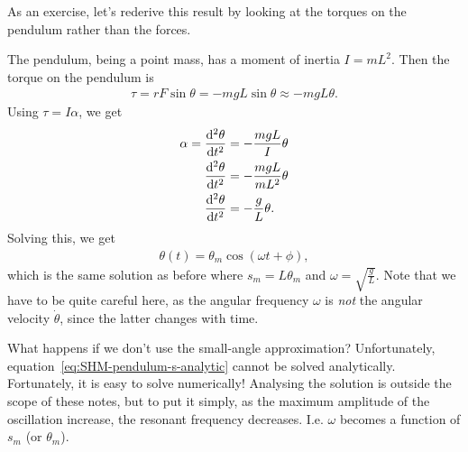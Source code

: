 \documentclass[../classical_mechanics.tex]{subfiles}
\begin{document}
            \begin{example}
                As an exercise, let's rederive this result by looking at the torques on the pendulum rather than the forces.

                The pendulum, being a point mass, has a moment of inertia $I=mL^2$.
                Then the torque on the pendulum is
                \begin{eqnarray}
                    \tau=rF\sin\theta=-mgL\sin\theta\approx -mgL\theta.
                \end{eqnarray}
                Using $\tau=I\alpha$, we get
                \begin{align}
                    \alpha=\dv[2]{\theta}{t}&=-\frac{mgL}{I}\theta\label{eq:SHM-pendulum-theta-moi}\\
                    \dv[2]{\theta}{t}&=-\frac{mgL}{mL^2}\theta\\
                    \dv[2]{\theta}{t}&=-\frac{g}{L}\theta.
                \end{align}
                Solving this, we get
                \begin{eqnarray}
                    \theta(t)=\theta_m\cos(\omega t+\phi),
                \end{eqnarray}
                which is the same solution as before where $s_m=L\theta_m$ and $\omega=\sqrt{\frac{g}{L}}$.
                Note that we have to be quite careful here, as the angular frequency $\omega$ is \textit{not} the angular velocity $\dot{\theta}$, since the latter changes with time.
            \end{example}

            What happens if we don't use the small-angle approximation?
            Unfortunately, equation~\ref{eq:SHM-pendulum-s-analytic} cannot be solved analytically.
            Fortunately, it is easy to solve numerically!
            Analysing the solution is outside the scope of these notes, but to put it simply, as the maximum amplitude of the oscillation increase, the resonant frequency decreases.
            I.e. $\omega$ becomes a function of $s_m$ (or $\theta_m$).
\end{document}
